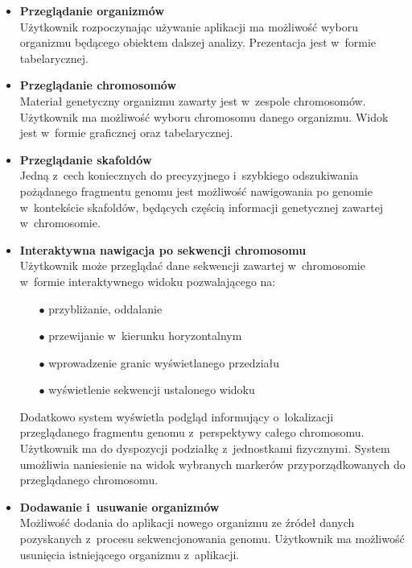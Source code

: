 \documentclass[a4paper,12pt,oneside]{mwrep}  %
\begin{document}
\begin{itemize}
\item \textbf{Przeglądanie organizmów}\\
Użytkownik rozpoczynając używanie aplikacji ma możliwość wyboru organizmu będącego obiektem dalszej analizy. Prezentacja jest w~formie tabelarycznej.\\

\item \textbf{Przeglądanie chromosomów}\\
Materiał genetyczny organizmu zawarty jest w~zespole chromosomów. Użytkownik ma możliwość wyboru chromosomu danego organizmu. Widok jest w~formie graficznej oraz tabelarycznej.\\

\item \textbf{Przeglądanie skafoldów}\\
Jedną z~cech koniecznych do precyzyjnego i~szybkiego odszukiwania pożądanego fragmentu genomu jest możliwość nawigowania po genomie w~kontekście skafoldów, będących częścią informacji genetycznej zawartej w~chromosomie.\\

\item \textbf{Interaktywna nawigacja po sekwencji chromosomu}\\
Użytkownik może przeglądać dane sekwencji zawartej w~chromosomie w~formie interaktywnego widoku pozwalającego na:
\begin{itemize}
\item[$\bullet$] przybliżanie, oddalanie
\item[$\bullet$] przewijanie w~kierunku horyzontalnym
\item[$\bullet$] wprowadzenie granic wyświetlanego przedziału
\item[$\bullet$] wyświetlenie sekwencji ustalonego widoku
\end{itemize}
Dodatkowo system wyświetla podgląd informujący o~lokalizacji przeglądanego fragmentu genomu z~perspektywy całego chromosomu. Użytkownik ma do dyspozycji podziałkę z~jednostkami fizycznymi.
System umożliwia naniesienie na widok wybranych markerów przyporządkowanych do przeglądanego chromosomu.\\

\item \textbf{Dodawanie i~usuwanie organizmów}\\
Możliwość dodania do aplikacji nowego organizmu ze źródeł danych pozyskanych z~procesu sekwencjonowania genomu. Użytkownik ma możliwość usunięcia istniejącego organizmu z~aplikacji.
\end{itemize}
\end{document}
